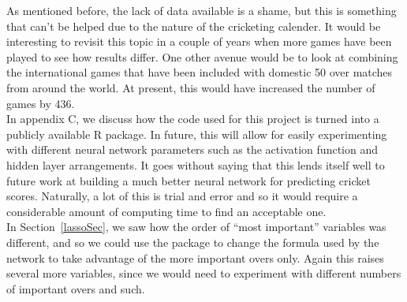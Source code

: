 As mentioned before, the lack of data available is a shame, but this is something that can't be helped due to the nature of the cricketing calender. It would be interesting to revisit this topic in a couple of years when more games have been played to see how results differ. One other avenue would be to look at combining the international games that have been included with domestic 50 over matches from around the world. At present, this would have increased the number of games by 436. \\ 

In appendix C, we discuss how the code used for this project is turned into a publicly available R package. In future, this will allow for easily experimenting with different neural 
network parameters such as the activation function and hidden layer arrangements. It goes without saying that this lends itself well to future work at building a much better neural network for predicting cricket scores.
Naturally, a lot of this is trial and error and so it would require a considerable amount of computing time to find an acceptable one. \\

In Section~\ref{lassoSec}, we saw how the order of ``most important'' variables was different, and so we could use the package to change the formula used by the network to take advantage of the more important overs only. Again this raises several more variables, since we would need to experiment with different numbers of important overs and such.
